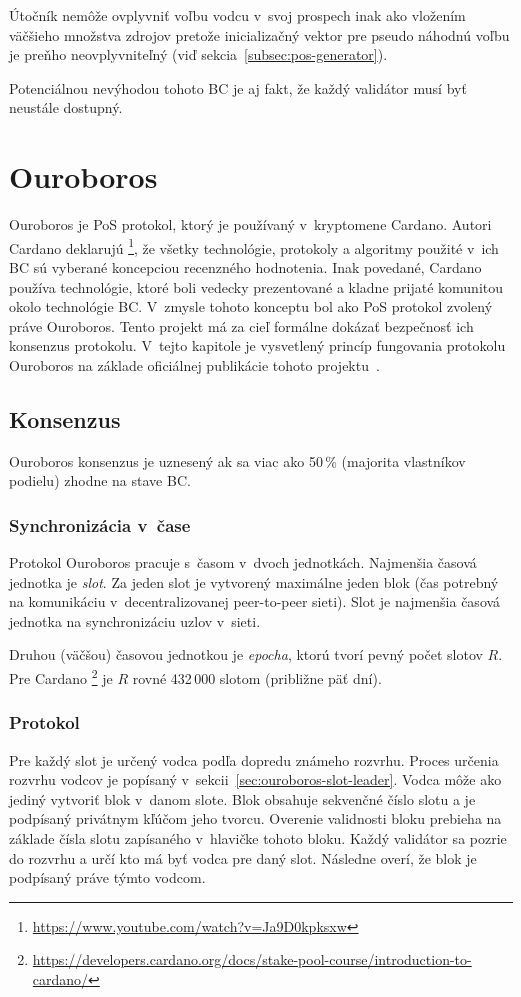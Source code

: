 Útočník nemôže ovplyvniť voľbu vodcu v~svoj prospech inak ako vložením väčšieho množstva zdrojov pretože inicializačný vektor pre pseudo náhodnú voľbu je preňho neovplyvniteľný (viď sekcia~\ref{subsec:pos-generator}).

Potenciálnou nevýhodou tohoto BC je aj fakt, že každý validátor musí byť neustále dostupný.

\chapter{Ouroboros}\label{chap:ouroboros}

Ouroboros je PoS protokol, ktorý je používaný v~kryptomene Cardano. Autori Cardano deklarujú%
\footnote{\url{https://www.youtube.com/watch?v=Ja9D0kpksxw}}, že všetky technológie, protokoly a algoritmy použité v~ich BC sú vyberané koncepciou recenzného hodnotenia. Inak povedané, Cardano používa technológie, ktoré boli vedecky prezentované a kladne prijaté komunitou okolo technológie BC. V~zmysle tohoto konceptu bol ako PoS protokol zvolený práve Ouroboros. Tento projekt má za cieľ formálne dokázať bezpečnosť ich konsenzus protokolu. V~tejto kapitole je vysvetlený princíp fungovania protokolu Ouroboros na základe oficiálnej publikácie tohoto projektu~\cite{ouroborosWp}.

\section{Konsenzus}
Ouroboros konsenzus je uznesený ak sa viac ako 50\,\% (majorita vlastníkov podielu) zhodne na stave BC.

\subsection{Synchronizácia v~čase}
Protokol Ouroboros pracuje s~časom v~dvoch jednotkách. Najmenšia časová jednotka je \textit{slot}. Za jeden slot je vytvorený maximálne jeden blok (čas potrebný na komunikáciu v~decentralizovanej peer-to-peer sieti). Slot je najmenšia časová jednotka na synchronizáciu uzlov v~sieti. 

Druhou (väčšou) časovou jednotkou je \textit{epocha}, ktorú tvorí pevný počet slotov $R$. Pre Cardano%
\footnote{\url{https://developers.cardano.org/docs/stake-pool-course/introduction-to-cardano/}} je $R$ rovné 432\,000 slotom (približne päť dní).

\subsection{Protokol}\label{subsec:ouroboros-protocol}
Pre každý slot je určený vodca podľa dopredu známeho rozvrhu. Proces určenia rozvrhu vodcov je popísaný v~sekcii~\ref{sec:ouroboros-slot-leader}. Vodca môže ako jediný vytvoriť blok v~danom slote. 
Blok obsahuje sekvenčné číslo slotu a je podpísaný privátnym kľúčom jeho tvorcu. Overenie validnosti bloku prebieha na základe čísla slotu zapísaného v~hlavičke tohoto bloku. Každý validátor sa pozrie do rozvrhu a určí kto má byť vodca pre daný slot. Následne overí, že blok je podpísaný práve týmto vodcom.

